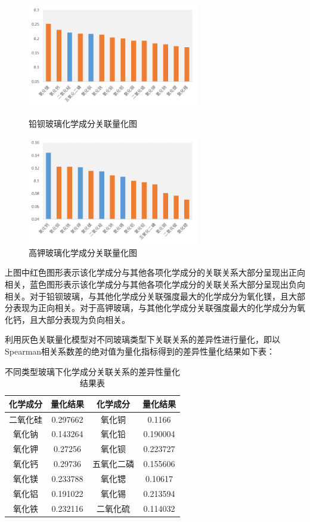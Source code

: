 \documentclass[withoutpreface,bwprint]{cumcmthesis} %
\begin{document}
\begin{figure}[H]
  \centering
  \begin{minipage}[t]{0.48\textwidth}
    \centering
    \includegraphics[width=7.5cm]{figure/铅得分}
    \caption{铅钡玻璃化学成分关联量化图}
    \label{fen}
  \end{minipage}
  \begin{minipage}[t]{0.48\textwidth}
    \centering
    \includegraphics[width=7.5cm]{figure/钾得分}
    \caption{高钾玻璃化学成分关联量化图}
    \label{f}
  \end{minipage}
\end{figure}

上图中红色图形表示该化学成分与其他各项化学成分的关联关系大部分呈现出正向相关，蓝色图形表示该化学成分与其他各项化学成分的关联关系大部分呈现出负向相关。对于铅钡玻璃，与其他化学成分关联强度最大的化学成分为氧化镁，且大部分表现为正向相关。对于高钾玻璃，与其他化学成分关联强度最大的化学成分为氧化钙，且大部分表现为负向相关。

利用灰色关联量化模型对不同玻璃类型下关联关系的差异性进行量化，即以Spearman相关系数差的绝对值为量化指标得到的差异性量化结果如下表：

\begin{table}[H]
  \centering
  \caption{不同类型玻璃下化学成分关联关系的差异性量化结果表}
  \begin{tabular}{cccc}
    \toprule[1.5pt]
    化学成分 & 量化结果     & 化学成分  & 量化结果     \\ \hline
    二氧化硅 & 0.297662 & 氧化铜   & 0.1166   \\
    氧化钠  & 0.143264 & 氧化铅   & 0.190004 \\
    氧化钾  & 0.27256  & 氧化钡   & 0.223727 \\
    氧化钙  & 0.29736  & 五氧化二磷 & 0.155606 \\
    氧化镁  & 0.233788 & 氧化锶   & 0.10617  \\
    氧化铝  & 0.191022 & 氧化锡   & 0.213594 \\
    氧化铁  & 0.232116 & 二氧化硫  & 0.114032 \\ \bottomrule[1.5pt]
  \end{tabular}
\end{table}
\end{document}
